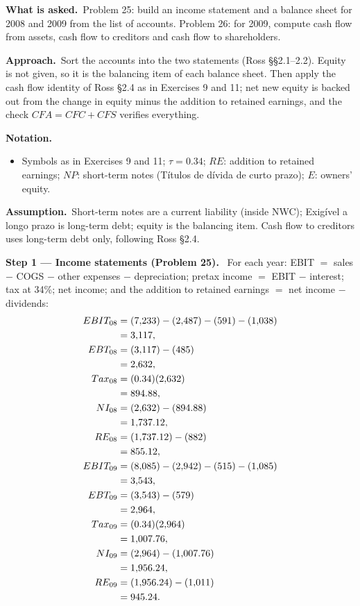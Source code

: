 \documentclass[11pt,a4paper]{article}
\newcommand{\notation}{\par\noindent\textbf{Notation.}}
\newcommand{\step}[2]{\par\medskip\noindent\textbf{Step #1 --- #2.}~}
\newcommand{\assume}{\par\smallskip\noindent\textbf{Assumption.}~}
\newcommand{\pt}{\foreignlanguage{brazilian}}
\newcommand{\asked}{\par\medskip\noindent\textbf{What is asked.}~}
\newcommand{\approach}{\par\smallskip\noindent\textbf{Approach.}~}
\begin{document}
\asked Problem 25: build an income statement and a balance sheet for 2008 and 2009 from the list
of accounts. Problem 26: for 2009, compute cash flow from assets, cash flow to creditors and cash
flow to shareholders.

\approach Sort the accounts into the two statements (Ross \S\S2.1--2.2). Equity is not given, so it
is the balancing item of each balance sheet. Then apply the cash flow identity of Ross \S2.4 as in
Exercises 9 and 11; net new equity is backed out from the change in equity minus the addition to
retained earnings, and the check $CFA = CFC + CFS$ verifies everything.

\notation
\begin{itemize}
  \item Symbols as in Exercises 9 and 11; $\tau = 0.34$; $RE$: addition to retained earnings;
        $NP$: short-term notes (\pt{T\'itulos de d\'ivida de curto prazo}); $E$: owners' equity.
\end{itemize}
\assume Short-term notes are a current liability (inside NWC); \pt{Exig\'ivel a longo prazo} is
long-term debt; equity is the balancing item. Cash flow to creditors uses long-term debt only,
following Ross \S2.4.

\step{1}{Income statements (Problem 25)}
For each year: EBIT $=$ sales $-$ COGS $-$ other expenses $-$ depreciation; pretax income $=$ EBIT
$-$ interest; tax at 34\%; net income; and the addition to retained earnings $=$ net income $-$
dividends:
\begin{align}
  EBIT_{08} &= (7{,}233) - (2{,}487) - (591) - (1{,}038) \notag\\
  &= 3{,}117, \label{e15-ebit8}\\
  EBT_{08} &= (3{,}117) - (485) \notag\\
  &= 2{,}632, \notag\\
  Tax_{08} &= (0.34)(2{,}632) \notag\\
  &= 894.88, \notag\\
  NI_{08} &= (2{,}632) - (894.88) \notag\\
  &= 1{,}737.12, \notag\\
  RE_{08} &= (1{,}737.12) - (882) \notag\\
  &= 855.12, \notag\\
  EBIT_{09} &= (8{,}085) - (2{,}942) - (515) - (1{,}085) \notag\\
  &= 3{,}543, \label{e15-ebit9}\\
  EBT_{09} &= (3{,}543) - (579) \notag\\
  &= 2{,}964, \notag\\
  Tax_{09} &= (0.34)(2{,}964) \notag\\
  &= 1{,}007.76, \label{e15-tax9}\\
  NI_{09} &= (2{,}964) - (1{,}007.76) \notag\\
  &= 1{,}956.24, \notag\\
  RE_{09} &= (1{,}956.24) - (1{,}011) \notag\\
  &= 945.24. \label{e15-re9}
\end{align}
\end{document}
